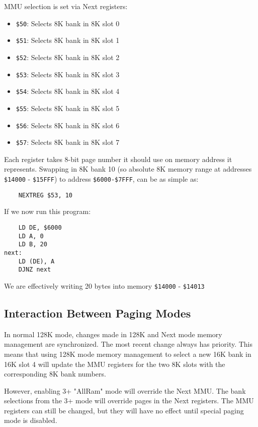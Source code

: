 \documentclass[12pt,twoside,openright,a4paper]{book}
\begin{document}
MMU selection is set via Next registers:

\begin{itemize}[topsep=1pt,itemsep=1pt]
	\item {\tt \$50}: Selects 8K bank in 8K slot 0
	\item {\tt \$51}: Selects 8K bank in 8K slot 1
	\item {\tt \$52}: Selects 8K bank in 8K slot 2
	\item {\tt \$53}: Selects 8K bank in 8K slot 3
	\item {\tt \$54}: Selects 8K bank in 8K slot 4
	\item {\tt \$55}: Selects 8K bank in 8K slot 5
	\item {\tt \$56}: Selects 8K bank in 8K slot 6
	\item {\tt \$57}: Selects 8K bank in 8K slot 7
\end{itemize}

Each register takes 8-bit page number it should use on memory address it represents. Swapping in 8K bank 10 (so absolute 8K memory range at addresses {\tt \$14000} - {\tt \$15FFF}) to address {\tt \$6000-\$7FFF}, can be as simple as:

\begin{Verbatim}
	NEXTREG $53, 10
\end{Verbatim}

If we now run this program:

\begin{Verbatim}
	LD DE, $6000
	LD A, 0
	LD B, 20
next:
	LD (DE), A
	DJNZ next
\end{Verbatim}

We are effectively writing 20 bytes into memory {\tt \$14000} - {\tt \$14013}

\subsection{Interaction Between Paging Modes}

In normal 128K mode, changes made in 128K and Next mode memory management are synchronized. The most recent change always has priority. This means that using 128K mode memory management to select a new 16K bank in 16K slot 4 will update the MMU registers for the two 8K slots with the corresponding 8K bank numbers.

However, enabling 3+ "AllRam" mode will override the Next MMU. The bank selections from the 3+ mode will override pages in the Next registers. The MMU registers can still be changed, but they will have no effect until special paging mode is disabled.
\end{document}
